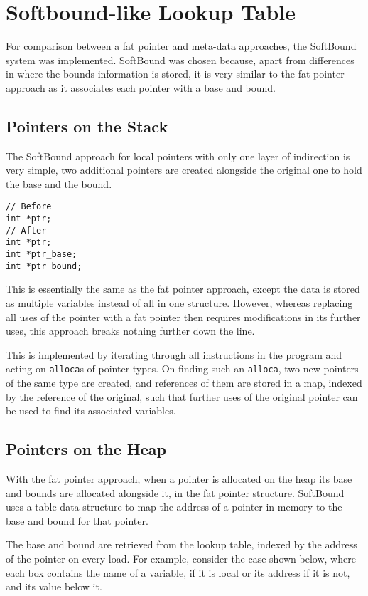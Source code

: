 \section{Softbound-like Lookup Table}

For comparison between a fat pointer and meta-data approaches, the SoftBound system was implemented.
SoftBound was chosen because, apart from differences in where the bounds information is stored, it is very similar to the fat pointer approach as it associates each pointer with a base and bound.

\subsection{Pointers on the Stack}

The SoftBound approach for local pointers with only one layer of indirection is very simple, two additional pointers are created alongside the original one to hold the base and the bound.

\begin{verbatim}
// Before
int *ptr;
// After
int *ptr;
int *ptr_base;
int *ptr_bound;
\end{verbatim}

This is essentially the same as the fat pointer approach, except the data is stored as multiple variables instead of all in one structure.
However, whereas replacing all uses of the pointer with a fat pointer then requires modifications in its further uses, this approach breaks nothing further down the line.

This is implemented by iterating through all instructions in the program and acting on \verb!alloca!s of pointer types.
On finding such an \verb!alloca!, two new pointers of the same type are created, and references of them are stored in a map, indexed by the reference of the original, such that further uses of the original pointer can be used to find its associated variables.

\subsection{Pointers on the Heap}

With the fat pointer approach, when a pointer is allocated on the heap its base and bounds are allocated alongside it, in the fat pointer structure.
SoftBound uses a table data structure to map the address of a pointer in memory to the base and bound for that pointer.

The base and bound are retrieved from the lookup table, indexed by the address of the pointer on every load.
For example, consider the case shown below, where each box contains the name of a variable, if it is local or its address if it is not, and its value below it. 

